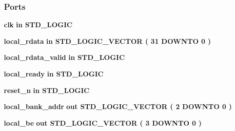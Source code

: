 \subsubsection*{Ports}
 \begin{DoxyCompactItemize}
\item 
{\bf clk}  {\bfseries {\bfseries \textcolor{keywordflow}{in}\textcolor{vhdlchar}{ }}} {\bfseries \textcolor{comment}{S\+T\+D\+\_\+\+L\+O\+G\+IC}\textcolor{vhdlchar}{ }} 
\item 
{\bf local\+\_\+rdata}  {\bfseries {\bfseries \textcolor{keywordflow}{in}\textcolor{vhdlchar}{ }}} {\bfseries \textcolor{comment}{S\+T\+D\+\_\+\+L\+O\+G\+I\+C\+\_\+\+V\+E\+C\+T\+OR}\textcolor{vhdlchar}{ }\textcolor{vhdlchar}{(}\textcolor{vhdlchar}{ }\textcolor{vhdlchar}{ } \textcolor{vhdldigit}{31} \textcolor{vhdlchar}{ }\textcolor{keywordflow}{D\+O\+W\+N\+TO}\textcolor{vhdlchar}{ }\textcolor{vhdlchar}{ } \textcolor{vhdldigit}{0} \textcolor{vhdlchar}{ }\textcolor{vhdlchar}{)}\textcolor{vhdlchar}{ }} 
\item 
{\bf local\+\_\+rdata\+\_\+valid}  {\bfseries {\bfseries \textcolor{keywordflow}{in}\textcolor{vhdlchar}{ }}} {\bfseries \textcolor{comment}{S\+T\+D\+\_\+\+L\+O\+G\+IC}\textcolor{vhdlchar}{ }} 
\item 
{\bf local\+\_\+ready}  {\bfseries {\bfseries \textcolor{keywordflow}{in}\textcolor{vhdlchar}{ }}} {\bfseries \textcolor{comment}{S\+T\+D\+\_\+\+L\+O\+G\+IC}\textcolor{vhdlchar}{ }} 
\item 
{\bf reset\+\_\+n}  {\bfseries {\bfseries \textcolor{keywordflow}{in}\textcolor{vhdlchar}{ }}} {\bfseries \textcolor{comment}{S\+T\+D\+\_\+\+L\+O\+G\+IC}\textcolor{vhdlchar}{ }} 
\item 
{\bf local\+\_\+bank\+\_\+addr}  {\bfseries {\bfseries \textcolor{keywordflow}{out}\textcolor{vhdlchar}{ }}} {\bfseries \textcolor{comment}{S\+T\+D\+\_\+\+L\+O\+G\+I\+C\+\_\+\+V\+E\+C\+T\+OR}\textcolor{vhdlchar}{ }\textcolor{vhdlchar}{(}\textcolor{vhdlchar}{ }\textcolor{vhdlchar}{ } \textcolor{vhdldigit}{2} \textcolor{vhdlchar}{ }\textcolor{keywordflow}{D\+O\+W\+N\+TO}\textcolor{vhdlchar}{ }\textcolor{vhdlchar}{ } \textcolor{vhdldigit}{0} \textcolor{vhdlchar}{ }\textcolor{vhdlchar}{)}\textcolor{vhdlchar}{ }} 
\item 
{\bf local\+\_\+be}  {\bfseries {\bfseries \textcolor{keywordflow}{out}\textcolor{vhdlchar}{ }}} {\bfseries \textcolor{comment}{S\+T\+D\+\_\+\+L\+O\+G\+I\+C\+\_\+\+V\+E\+C\+T\+OR}\textcolor{vhdlchar}{ }\textcolor{vhdlchar}{(}\textcolor{vhdlchar}{ }\textcolor{vhdlchar}{ } \textcolor{vhdldigit}{3} \textcolor{vhdlchar}{ }\textcolor{keywordflow}{D\+O\+W\+N\+TO}\textcolor{vhdlchar}{ }\textcolor{vhdlchar}{ } \textcolor{vhdldigit}{0} \textcolor{vhdlchar}{ }\textcolor{vhdlchar}{)}\textcolor{vhdlchar}{ }} 

\end{DoxyCompactItemize}
